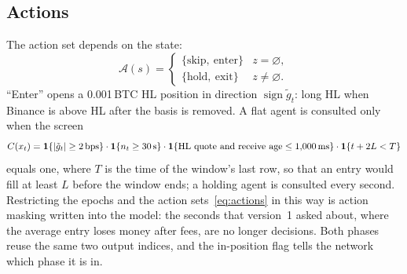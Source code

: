 \documentclass[12pt,a4paper]{article}
\DeclareRobustCommand{\bps}{\ifmmode\,\text{bps}\else\,bps\fi}
\newcommand{\gt}{\tilde g}
\begin{document}
\subsection{Actions}
The action set depends on the state:
\begin{equation}
\mathcal{A}(s)=\begin{cases}\{\text{skip},\ \text{enter}\} & z=\varnothing,\\
\{\text{hold},\ \text{exit}\} & z\neq\varnothing.\end{cases}
\label{eq:actions}
\end{equation}
``Enter'' opens a 0.001\,BTC HL position in direction $\operatorname{sign}\gt_t$: long HL when
Binance is above HL after the basis is removed. A flat agent is consulted only when the screen
\begin{equation}
C(x_t)=\mathbf{1}\{|\gt_t|\geq 2\bps\}\cdot\mathbf{1}\{n_t\geq 30\text{\,s}\}\cdot
\mathbf{1}\{\text{HL quote and receive age}\leq 1{,}000\text{\,ms}\}\cdot
\mathbf{1}\{t+2L<T\}
\label{eq:screen}
\end{equation}
equals one, where $T$ is the time of the window's last row, so that an entry would fill at
least $L$ before the window ends; a holding agent is consulted every second. Restricting the
epochs and the action sets~\eqref{eq:actions} in this way is action masking written into the
model: the seconds that version~1 asked about, where the average entry loses money after fees,
are no longer decisions. Both phases reuse the same two output indices, and the in-position
flag tells the network which phase it is in.
\end{document}
